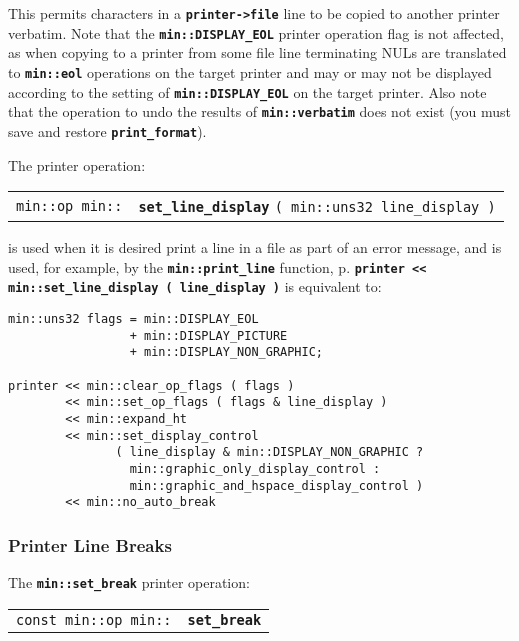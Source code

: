 \documentclass[12pt]{article}
\makeatletter
\newcommand{\TT}[1]{{\tt \bfseries #1}}
\newcommand{\ttindex}[1]{\index{#1@{\tt #1}}}
\newcommand{\pagref}[1]{p\pageref{#1}}
\newcommand{\EOL}{\penalty \exhyphenpenalty}
\newenvironment{indpar}[1][0.3in]%
	{\begin{list}{}%
		     {\setlength{\itemsep}{0in}%
		      \setlength{\topsep}{0in}%
		      \setlength{\parsep}{1ex}%
		      \setlength{\labelwidth}{#1}%
		      \setlength{\leftmargin}{#1}%
		      \addtolength{\leftmargin}{\labelsep}}%
	 \item}%
	{\end{list}}
\newcommand{\LABEL}[1]{\label{#1}}
\newcommand{\MINKEY}[1]%
	   {\TT{#1}\ttindex{min::#1}\ttindex{#1}}
\makeatother
\begin{document}
This permits characters in a \TT{printer->file} line to be copied
to another printer verbatim.  Note that
the \TT{min::\EOL DISPLAY\_\EOL EOL} printer operation flag
is not affected, as when copying to a printer from some file
line terminating NULs are translated to \TT{min::\EOL eol}
operations on the target printer and may or may not be
displayed according to the setting of
\TT{min::\EOL DISPLAY\_\EOL EOL} on the target printer.
Also note that the operation to undo the results
of \TT{min::\EOL verbatim} does not exist (you must save and restore
\TT{print\_\EOL format}).

The printer operation:

\begin{indpar}[1em]\begin{tabular}{r@{}l}
\verb|min::op min::|
    & \MINKEY{set\_line\_display} \verb|( min::uns32 line_display )|
\LABEL{MIN::SET_LINE_DISPLAY} \\
\end{tabular}\end{indpar}

is used when it is desired print a line in a file as part of an
error message, and is used, for example, by the
\TT{min::\EOL print\_\EOL line} function, \pagref{MIN::PRINT_LINE}.
\TT{printer <{}< min::\EOL set\_\EOL line\_\EOL display ( line\_\EOL display )}
is equivalent to:

\begin{indpar}\begin{verbatim}
min::uns32 flags = min::DISPLAY_EOL
                 + min::DISPLAY_PICTURE
                 + min::DISPLAY_NON_GRAPHIC;

printer << min::clear_op_flags ( flags )
        << min::set_op_flags ( flags & line_display )
        << min::expand_ht
        << min::set_display_control
               ( line_display & min::DISPLAY_NON_GRAPHIC ?
                 min::graphic_only_display_control :
                 min::graphic_and_hspace_display_control )
        << min::no_auto_break
\end{verbatim}\end{indpar}

\subsubsection{Printer Line Breaks}
\label{PRINTER-LINE-BREAKS}

The \TT{min::set\_\EOL break} printer operation:

\begin{indpar}[1em]\begin{tabular}{r@{}l}
\verb|const min::op min::| & \MINKEY{set\_\EOL break}
\LABEL{MIN::SET_BREAK} \\
\end{tabular}\end{indpar}
\end{document}
